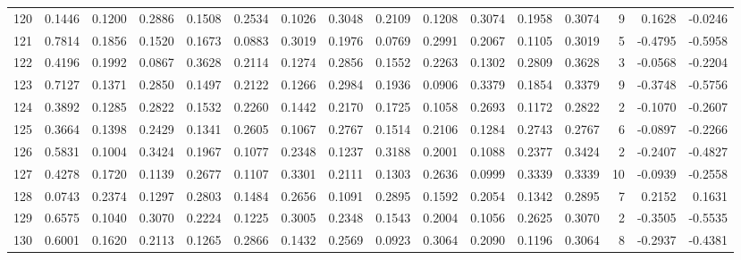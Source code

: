 \begin{tabular}{lrrrrrrrrrrrrrrr}
120 &      0.1446 &  0.1200 &  0.2886 &  0.1508 &  0.2534 &  0.1026 &  0.3048 &  0.2109 &  0.1208 &  0.3074 &   0.1958 &     0.3074 &      9 &                    0.1628 &                    -0.0246 \\
121 &      0.7814 &  0.1856 &  0.1520 &  0.1673 &  0.0883 &  0.3019 &  0.1976 &  0.0769 &  0.2991 &  0.2067 &   0.1105 &     0.3019 &      5 &                   -0.4795 &                    -0.5958 \\
122 &      0.4196 &  0.1992 &  0.0867 &  0.3628 &  0.2114 &  0.1274 &  0.2856 &  0.1552 &  0.2263 &  0.1302 &   0.2809 &     0.3628 &      3 &                   -0.0568 &                    -0.2204 \\
123 &      0.7127 &  0.1371 &  0.2850 &  0.1497 &  0.2122 &  0.1266 &  0.2984 &  0.1936 &  0.0906 &  0.3379 &   0.1854 &     0.3379 &      9 &                   -0.3748 &                    -0.5756 \\
124 &      0.3892 &  0.1285 &  0.2822 &  0.1532 &  0.2260 &  0.1442 &  0.2170 &  0.1725 &  0.1058 &  0.2693 &   0.1172 &     0.2822 &      2 &                   -0.1070 &                    -0.2607 \\
125 &      0.3664 &  0.1398 &  0.2429 &  0.1341 &  0.2605 &  0.1067 &  0.2767 &  0.1514 &  0.2106 &  0.1284 &   0.2743 &     0.2767 &      6 &                   -0.0897 &                    -0.2266 \\
126 &      0.5831 &  0.1004 &  0.3424 &  0.1967 &  0.1077 &  0.2348 &  0.1237 &  0.3188 &  0.2001 &  0.1088 &   0.2377 &     0.3424 &      2 &                   -0.2407 &                    -0.4827 \\
127 &      0.4278 &  0.1720 &  0.1139 &  0.2677 &  0.1107 &  0.3301 &  0.2111 &  0.1303 &  0.2636 &  0.0999 &   0.3339 &     0.3339 &     10 &                   -0.0939 &                    -0.2558 \\
128 &      0.0743 &  0.2374 &  0.1297 &  0.2803 &  0.1484 &  0.2656 &  0.1091 &  0.2895 &  0.1592 &  0.2054 &   0.1342 &     0.2895 &      7 &                    0.2152 &                     0.1631 \\
129 &      0.6575 &  0.1040 &  0.3070 &  0.2224 &  0.1225 &  0.3005 &  0.2348 &  0.1543 &  0.2004 &  0.1056 &   0.2625 &     0.3070 &      2 &                   -0.3505 &                    -0.5535 \\
130 &      0.6001 &  0.1620 &  0.2113 &  0.1265 &  0.2866 &  0.1432 &  0.2569 &  0.0923 &  0.3064 &  0.2090 &   0.1196 &     0.3064 &      8 &                   -0.2937 &                    -0.4381 \\

\end{tabular}
